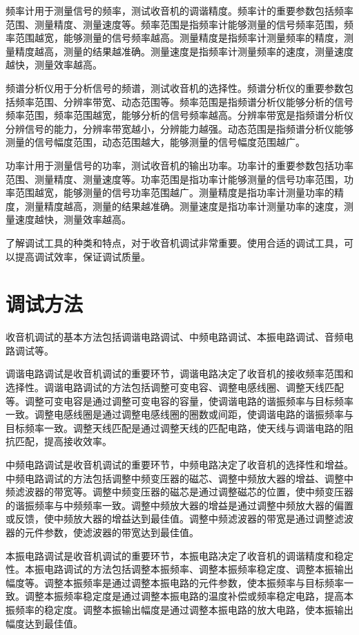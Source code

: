 \documentclass[12pt,UTF8]{ctexbook}
\begin{document}
频率计用于测量信号的频率，测试收音机的调谐精度。频率计的重要参数包括频率范围、测量精度、测量速度等。频率范围是指频率计能够测量的信号频率范围，频率范围越宽，能够测量的信号频率越高。测量精度是指频率计测量频率的精度，测量精度越高，测量的结果越准确。测量速度是指频率计测量频率的速度，测量速度越快，测量效率越高。

频谱分析仪用于分析信号的频谱，测试收音机的选择性。频谱分析仪的重要参数包括频率范围、分辨率带宽、动态范围等。频率范围是指频谱分析仪能够分析的信号频率范围，频率范围越宽，能够分析的信号频率越高。分辨率带宽是指频谱分析仪分辨信号的能力，分辨率带宽越小，分辨能力越强。动态范围是指频谱分析仪能够测量的信号幅度范围，动态范围越大，能够测量的信号幅度范围越广。

功率计用于测量信号的功率，测试收音机的输出功率。功率计的重要参数包括功率范围、测量精度、测量速度等。功率范围是指功率计能够测量的信号功率范围，功率范围越宽，能够测量的信号功率范围越广。测量精度是指功率计测量功率的精度，测量精度越高，测量的结果越准确。测量速度是指功率计测量功率的速度，测量速度越快，测量效率越高。

了解调试工具的种类和特点，对于收音机调试非常重要。使用合适的调试工具，可以提高调试效率，保证调试质量。

\section{调试方法}

收音机调试的基本方法包括调谐电路调试、中频电路调试、本振电路调试、音频电路调试等。

调谐电路调试是收音机调试的重要环节，调谐电路决定了收音机的接收频率范围和选择性。调谐电路调试的方法包括调整可变电容、调整电感线圈、调整天线匹配等。调整可变电容是通过调整可变电容的容量，使调谐电路的谐振频率与目标频率一致。调整电感线圈是通过调整电感线圈的圈数或间距，使调谐电路的谐振频率与目标频率一致。调整天线匹配是通过调整天线的匹配电路，使天线与调谐电路的阻抗匹配，提高接收效率。

中频电路调试是收音机调试的重要环节，中频电路决定了收音机的选择性和增益。中频电路调试的方法包括调整中频变压器的磁芯、调整中频放大器的增益、调整中频滤波器的带宽等。调整中频变压器的磁芯是通过调整磁芯的位置，使中频变压器的谐振频率与中频频率一致。调整中频放大器的增益是通过调整中频放大器的偏置或反馈，使中频放大器的增益达到最佳值。调整中频滤波器的带宽是通过调整滤波器的元件参数，使滤波器的带宽达到最佳值。

本振电路调试是收音机调试的重要环节，本振电路决定了收音机的调谐精度和稳定性。本振电路调试的方法包括调整本振频率、调整本振频率稳定度、调整本振输出幅度等。调整本振频率是通过调整本振电路的元件参数，使本振频率与目标频率一致。调整本振频率稳定度是通过调整本振电路的温度补偿或频率稳定电路，提高本振频率的稳定度。调整本振输出幅度是通过调整本振电路的放大电路，使本振输出幅度达到最佳值。
\end{document}
